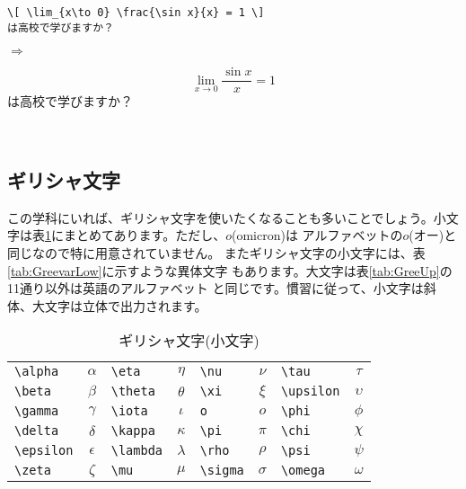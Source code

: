\begin{minipage}[c]{.50\textwidth}
\begin{screen}
\small
\begin{verbatim}
\[ \lim_{x\to 0} \frac{\sin x}{x} = 1 \]
は高校で学びますか？
\end{verbatim}
\end{screen}
\end{minipage}%
$\Rightarrow$
\begin{minipage}{.45\textwidth}
\begin{shadebox}
\[ \lim_{x\to 0} \frac{\sin x}{x} = 1 \]
は高校で学びますか？
\end{shadebox}
\end{minipage}
\vspace*{1mm}\\

\subsection{ギリシャ文字}
この学科にいれば、ギリシャ文字を使いたくなることも多いことでしょう。小文
字は表\ref{tab:GreeLow}にまとめてあります。ただし、$o$(omicron)は
アルファベットの$o$(オー)と同じなので特に用意されていません。
またギリシャ文字の小文字には、表\ref{tab:GreevarLow}に示すような異体文字
もあります。大文字は表\ref{tab:GreeUp}の11通り以外は英語のアルファベット
と同じです。慣習に従って、小文字は斜体、大文字は立体で出力されます。
\begin{table}[htbp]
\begin{center}
\caption{ギリシャ文字(小文字)}
\label{tab:GreeLow}
\begin{tabular}{lc|lc|lc|lc}
 \verb+\alpha+   & $\alpha$   & \verb+\eta+     & $\eta$     &
 \verb+\nu+      & $\nu$      & \verb+\tau+     & $\tau$     \\
 \verb+\beta+    & $\beta$    & \verb+\theta+   & $\theta$   &
 \verb+\xi+      & $\xi$      & \verb+\upsilon+ & $\upsilon$ \\
 \verb+\gamma+   & $\gamma$   & \verb+\iota+    & $\iota$    &
 \verb+o+      & $o$        & \verb+\phi+     & $\phi$     \\
 \verb+\delta+   & $\delta$   & \verb+\kappa+   & $\kappa$   &
 \verb+\pi+      & $\pi$      & \verb+\chi+     & $\chi$     \\
 \verb+\epsilon+ & $\epsilon$ & \verb+\lambda+  & $\lambda$  &
 \verb+\rho+     & $\rho$     & \verb+\psi+     & $\psi$     \\
 \verb+\zeta+    & $\zeta$    & \verb+\mu+      & $\mu$      &
 \verb+\sigma+   & $\sigma$   & \verb+\omega+   & $\omega$
\end{tabular}
\end{center}
\end{table}

